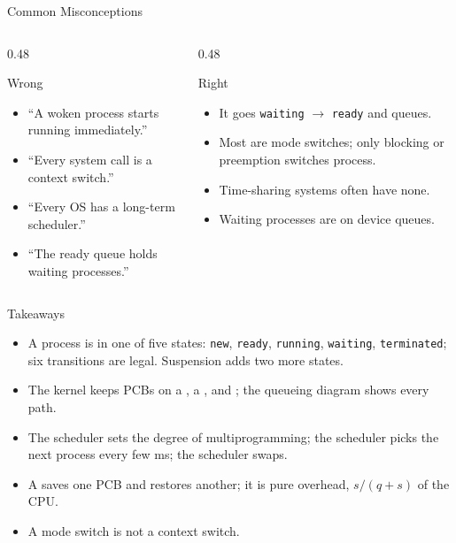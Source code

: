 \documentclass[aspectratio=169]{beamer}
\begin{document}
\begin{frame}{Common Misconceptions}
  \begin{columns}[T]
    \begin{column}{0.48\textwidth}
      \begin{block}{Wrong}
        \begin{itemize}
          \item ``A woken process starts running immediately.''
          \item ``Every system call is a context switch.''
          \item ``Every OS has a long-term scheduler.''
          \item ``The ready queue holds waiting processes.''
        \end{itemize}
      \end{block}
    \end{column}
    \begin{column}{0.48\textwidth}
      \begin{block}{Right}
        \begin{itemize}
          \item It goes \texttt{waiting} $\to$ \texttt{ready} and queues.
          \item Most are mode switches; only blocking or preemption switches
            process.
          \item Time-sharing systems often have none.
          \item Waiting processes are on device queues.
        \end{itemize}
      \end{block}
    \end{column}
  \end{columns}
\end{frame}

\begin{frame}{Takeaways}
  \begin{itemize}
    \item A process is in one of five states: \texttt{new}, \texttt{ready},
      \texttt{running}, \texttt{waiting}, \texttt{terminated}; six transitions
      are legal. Suspension adds two more states.
    \item The kernel keeps PCBs on a , a ,
      and ; the queueing diagram shows every path.
    \item The  scheduler sets the degree of multiprogramming;
      the  scheduler picks the next process every few ms; the
       scheduler swaps.
    \item A  saves one PCB and restores another; it is
      pure overhead, $s/(q+s)$ of the CPU.
    \item A mode switch is not a context switch.
  \end{itemize}
\end{frame}
\end{document}
